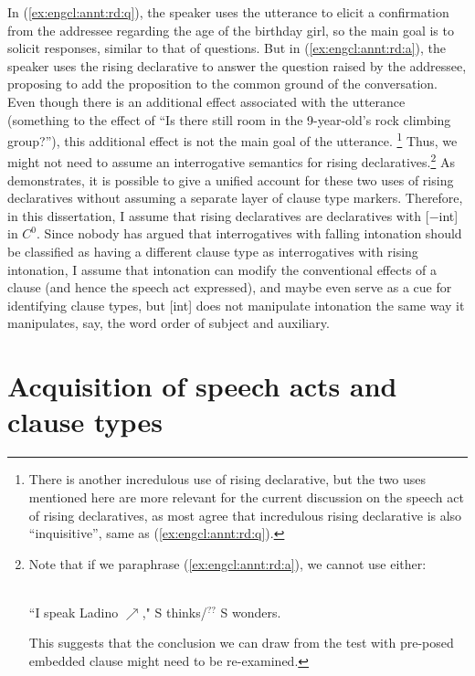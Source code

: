 In (\ref{ex:engcl:annt:rd:q}), the speaker uses the utterance to elicit a confirmation from the addressee regarding the age of the birthday girl, so the main goal is to solicit responses, similar to that of questions. But in (\ref{ex:engcl:annt:rd:a}), the speaker uses the rising declarative to answer the question raised by the addressee, proposing to add the proposition  to the common ground of the conversation. Even though there is an additional effect associated with the utterance (something to the effect of ``Is there still room in the 9-year-old’s rock climbing group?''), this additional effect is not the main goal of the utterance. \footnote{There is another incredulous use of rising declarative, but the two uses mentioned here are more relevant for the current discussion on the speech act of rising declaratives, as most agree that incredulous rising declarative is also ``inquisitive'', same as (\ref{ex:engcl:annt:rd:q}).} Thus, we might not need to assume an interrogative semantics for rising declaratives.\footnote{Note that if we paraphrase (\ref{ex:engcl:annt:rd:a}), we cannot use  either:

\\
``I speak Ladino $\nearrow$," S thinks/$^{??}$ S wonders.
\eex
 
This suggests that the conclusion we can draw from the test with pre-posed embedded clause might need to be re-examined.}  As \textcite{goodhue2021rd} demonstrates, it is possible to give a unified account for these two uses of rising declaratives without assuming a separate layer of clause type markers. Therefore, in this dissertation, I assume that rising declaratives are declaratives with [$-$int] in $C^{0}$. Since nobody has argued that interrogatives with falling intonation should be classified as having a different clause type as interrogatives with rising intonation, I assume that intonation can modify the conventional effects of a clause (and hence the speech act expressed), and maybe even serve as a cue for identifying clause types, but [\textpm int] does not manipulate intonation the same way it manipulates, say, the word order of subject and auxiliary.



\section{Acquisition of speech acts and clause types}
\label{sec:bg:acq}
